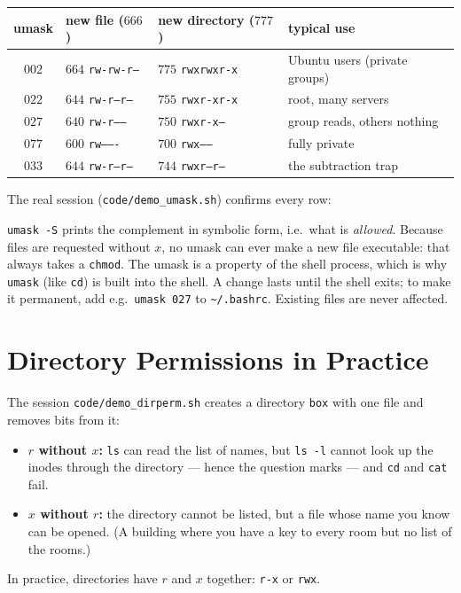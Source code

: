 \documentclass[11pt,a4paper]{article}
\newcommand{\cmd}[1]{\texttt{#1}}
\begin{document}
\begin{center}
\small
\begin{tabular}{@{}c l l l@{}}
\toprule
\textbf{umask} & \textbf{new file} ($666$) & \textbf{new directory} ($777$) & \textbf{typical use} \\
\midrule
$002$ & $664$ \texttt{rw-rw-r--} & $775$ \texttt{rwxrwxr-x} & Ubuntu users (private groups) \\
$022$ & $644$ \texttt{rw-r--r--} & $755$ \texttt{rwxr-xr-x} & root, many servers \\
$027$ & $640$ \texttt{rw-r-----} & $750$ \texttt{rwxr-x---} & group reads, others nothing \\
$077$ & $600$ \texttt{rw-------} & $700$ \texttt{rwx------} & fully private \\
$033$ & $644$ \texttt{rw-r--r--} & $744$ \texttt{rwxr--r--} & the subtraction trap \\
\bottomrule
\end{tabular}
\end{center}

The real session (\cmd{code/demo\_umask.sh}) confirms every row:



\cmd{umask -S} prints the complement in symbolic form, i.e.\ what is \emph{allowed}. Because files are requested without $x$, no umask can ever make a new file executable: that always takes a \cmd{chmod}. The umask is a property of the shell process, which is why \cmd{umask} (like \cmd{cd}) is built into the shell. A change lasts until the shell exits; to make it permanent, add e.g.\ \texttt{umask 027} to \texttt{\textasciitilde/.bashrc}. Existing files are never affected.

\section{Directory Permissions in Practice}
\label{sec:dirs}

The session \cmd{code/demo\_dirperm.sh} creates a directory \texttt{box} with one file and removes bits from it:



\begin{itemize}
  \item \textbf{$r$ without $x$:} \cmd{ls} can read the list of names, but \cmd{ls -l} cannot look up the inodes through the directory --- hence the question marks --- and \cmd{cd} and \cmd{cat} fail.
  \item \textbf{$x$ without $r$:} the directory cannot be listed, but a file whose name you know can be opened. (A building where you have a key to every room but no list of the rooms.)
\end{itemize}
In practice, directories have $r$ and $x$ together: \texttt{r-x} or \texttt{rwx}.
\end{document}
